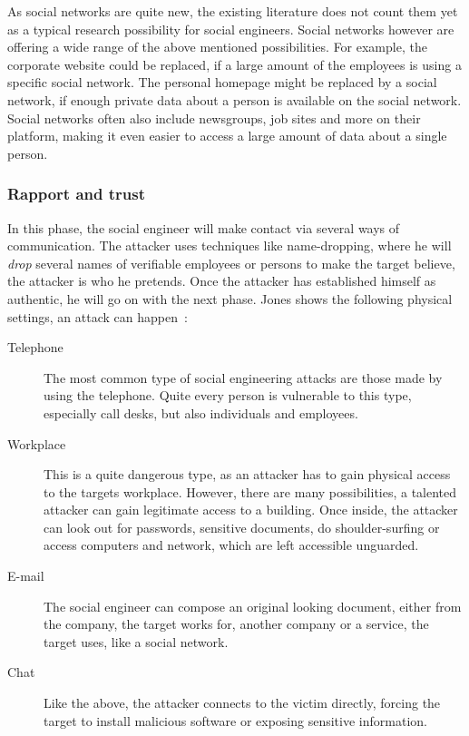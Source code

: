 As social networks are quite new, the existing literature does not count them
yet as a typical research possibility for social engineers. Social networks
however are offering a wide range of the above mentioned possibilities. For
example, the corporate website could be replaced, if a large amount of the
employees is using a specific social network. The personal homepage might be
replaced by a social network, if enough private data about a person is
available on the social network. Social networks often also include newsgroups,
job sites and more on their platform, making it even easier to access a large
amount of data about a single person.


\subsubsection{Rapport and trust}

In this phase, the social engineer will make contact via several ways of
communication. The attacker uses techniques like name-dropping, where he will
\textit{drop} several names of verifiable employees or persons to make the
target believe, the attacker is who he pretends. Once the attacker has
established himself as authentic, he will go on with the next phase. Jones
shows the following physical settings, an attack can happen~\cite{jones2004}:

\begin{description}
\item[Telephone] The most common type of social engineering attacks are those
  made by using the telephone. Quite every person is vulnerable to this type,
  especially call desks, but also individuals and employees.
\item[Workplace] This is a quite dangerous type, as an attacker has to gain
  physical access to the targets workplace. However, there are many
  possibilities, a talented attacker can gain legitimate access to a building.
  Once inside, the attacker can look out for passwords, sensitive documents,
  do shoulder-surfing or access computers and network, which are left
  accessible unguarded.
\item[E-mail] The social engineer can compose an original looking document,
  either from the company, the target works for, another company or a service,
  the target uses, like a social network.
\item[Chat] Like the above, the attacker connects to the victim directly,
  forcing the target to install malicious software or exposing sensitive
  information.
\end{description}

